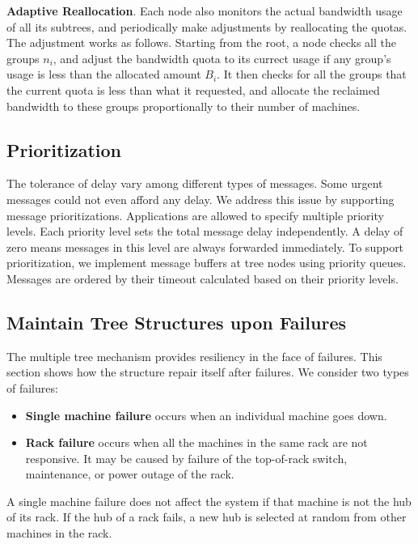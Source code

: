 \textbf{Adaptive Reallocation}.  Each node also monitors the actual bandwidth
usage of all its subtrees, and periodically make adjustments by reallocating
the quotas.  The adjustment works as follows.  Starting from the root, a node
checks all the groups $n_i$, and adjust the bandwidth quota to its currect
usage if any group's usage is less than the allocated amount $B_i$.  It then
checks for all the groups that the current quota is less than what it
requested, and allocate the reclaimed bandwidth to these groups proportionally
to their number of machines.

\subsection{Prioritization}

The tolerance of delay vary among different types of messages.  Some urgent
messages could not even afford any delay.  We address this issue by supporting
message prioritizations.  Applications are allowed to specify multiple priority
levels.  Each priority level sets the total message delay independently.  A
delay of zero means messages in this level are always forwarded immediately.
To support prioritization, we implement message buffers at tree nodes using
priority queues.  Messages are ordered by their timeout calculated based on
their priority levels.

\subsection{Maintain Tree Structures upon Failures}

The multiple tree mechanism provides resiliency in the face of failures.  This
section shows how the structure repair itself after failures.  We consider two
types of failures:

\begin{itemize}
\item \textbf{Single machine failure} occurs when an individual machine goes down.
\item \textbf{Rack failure} occurs when all the machines in the same rack are not
responsive.  It may be caused by failure of the top-of-rack switch,
maintenance, or power outage of the rack.
\end{itemize}

A single machine failure does not affect the system if that machine is not the
hub of its rack.  If the hub of a rack fails, a new hub is selected at random
from other machines in the rack.

